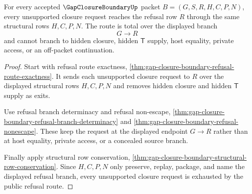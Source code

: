 \begin{theorem}
\label{thm:gap-closure-boundary-refusal-route-totality}
For every accepted $\GapClosureBoundaryUp$ packet $B=(G,S,R,H,C,P,N)$, every
unsupported closure request reaches the refusal row $R$ through the same
structural rows $H,C,P,N$. The route is total over the displayed branch
$$
G \longrightarrow R
$$
and cannot branch to hidden closure, hidden $\mathsf{T}$ supply, host equality,
private access, or an off-packet continuation.
\end{theorem}
\begin{proof}
Start with refusal route exactness,
\autoref{thm:gap-closure-boundary-refusal-route-exactness}. It sends each
unsupported closure request to $R$ over the displayed structural rows
$H,C,P,N$ and removes hidden closure and hidden $\mathsf{T}$ supply as exits.

Use refusal branch determinacy and refusal non-escape,
\autoref{thm:gap-closure-boundary-refusal-branch-determinacy} and
\autoref{thm:gap-closure-boundary-refusal-nonescape}. These keep the request at
the displayed endpoint $G \longrightarrow R$ rather than at host equality,
private access, or a concealed source branch.

Finally apply structural row conservation,
\autoref{thm:gap-closure-boundary-structural-row-conservation}. Since
$H,C,P,N$ only preserve, replay, package, and name the displayed refusal
branch, every unsupported closure request is exhausted by the public refusal
route.
\end{proof}
